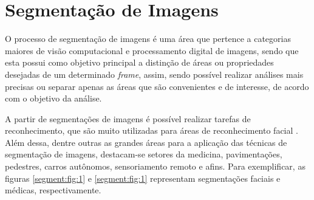 \newpage
\clearpage
\section{Segmentação de Imagens}
O processo de segmentação de imagens é uma área que pertence a categorias maiores de visão computacional e processamento digital de imagens, sendo que esta possui como objetivo principal a distinção de áreas ou propriedades desejadas \cite{Haralick1985, Yuheng2017ImageOverview, Ghosh2019} de um determinado \textit{frame}, assim, sendo possível realizar análises mais precisas ou separar apenas as áreas que são convenientes e de interesse, de acordo com o objetivo da análise.

A partir de segmentações de imagens é possível realizar tarefas de reconhecimento, que são muito utilizadas para áreas de reconhecimento facial \cite{Yuheng2017ImageOverview}. Além dessa, dentre outras as grandes áreas para a aplicação das técnicas de segmentação de imagens, destacam-se setores da medicina, pavimentações, pedestres, carros autônomos, sensoriamento remoto e afins. Para exemplificar, as figuras \ref{segment:fig:1} e \ref{segment:fig:1} representam segmentações faciais e médicas, respectivamente.  

